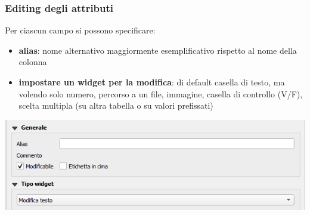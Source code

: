 \documentclass{beamer}
\begin{document}
{\begin{frame}
   \frametitle{Editing degli attributi} 
	Per ciascun campo si possono specificare: \begin{itemize}
		\item \textbf{alias}: nome alternativo maggiormente esemplificativo rispetto al nome della colonna
		\item \textbf{impostare un widget per la modifica}: di default casella di testo, ma volendo solo numero, percorso a un file, immagine, casella di controllo (V/F), scelta multipla (su altra tabella o su valori prefissati) 
	\end{itemize}
	\begin{center}
		\includegraphics[width=1\textwidth] {pics/campi_attributi2-3.png}
	\end{center}
\end{frame}


}
\end{document}
